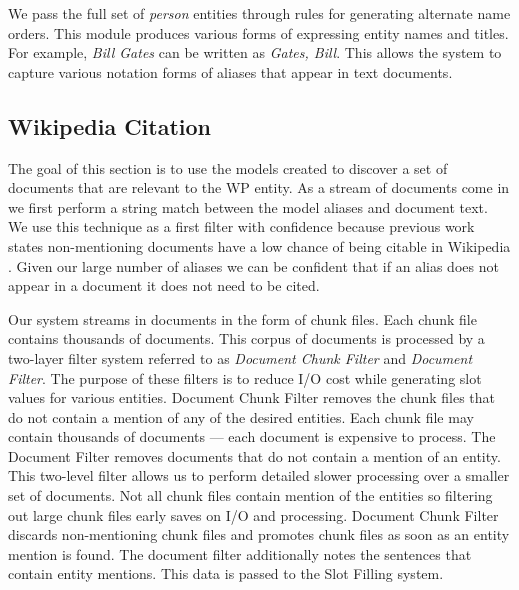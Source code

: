 \documentclass[letterpaper]{article}
\begin{document}
We pass the full set of \textit{person} entities through rules for generating alternate name orders.
This module produces various forms of expressing entity names and titles.
For example, \textsl{Bill Gates} can be written as \textsl{Gates, Bill}.
This allows the system to capture various notation forms of aliases that appear in text documents.

\subsection{Wikipedia Citation}
The goal of this section is to use the models created to discover a set of documents that are relevant to the WP entity.
As a stream of documents come in we first perform a string match between the model aliases and document text. 
We use this technique as a first filter with confidence because previous work states non-mentioning
documents have a low chance of being citable in Wikipedia \cite{JFrank12}.
Given our large number of aliases we can be confident that if an alias does not appear in a document it does not need to be cited.

Our system streams in documents in the form of chunk files.
Each chunk file contains thousands of documents.
This corpus of documents is processed by a two-layer filter system referred to as \textit{Document Chunk Filter} and \textit{Document Filter}.
The purpose of these filters is to reduce I/O cost while generating slot values for various entities.
Document Chunk Filter removes the chunk files that do not contain a mention of any of the desired entities.
Each chunk file may contain thousands of documents --- each document is expensive to process.
The Document Filter removes documents that do not contain a mention of an entity.
This two-level filter allows us to perform detailed slower processing over a smaller set of documents.
Not all chunk files contain mention of the entities so filtering out large chunk files early saves on I/O and processing.
Document Chunk Filter discards non-mentioning chunk files and promotes chunk files as soon as an entity mention is found.
The document filter additionally notes the sentences that contain entity mentions.
This data is passed to the Slot Filling system.
\end{document}
